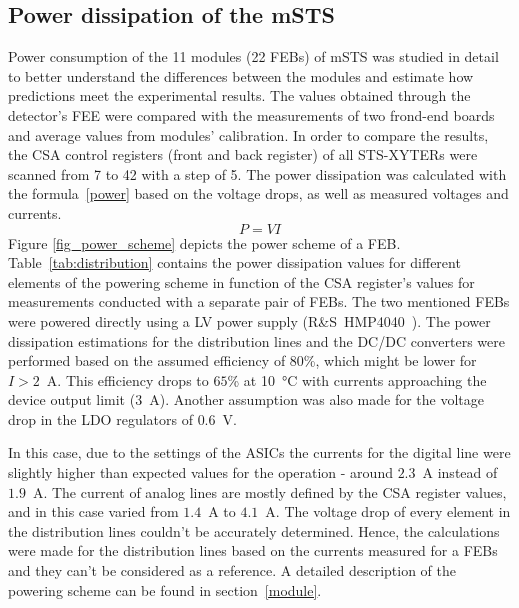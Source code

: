 \subsection{Power dissipation of the mSTS}
 Power consumption of the 11 modules (22 \glspl{FEB}) of \gls{mSTS} was studied in detail to better understand the differences between the modules and estimate how predictions meet the experimental results. The values obtained through the detector's \gls{FEE} were compared with the measurements of two frond-end boards and average values from modules' calibration. In order to compare the results, the \gls{CSA} control registers (front and back register) of all STS-XYTERs were scanned from 7 to 42 with a step of 5. The power dissipation was calculated with the formula~\ref{power} based on the voltage drops, as well as measured voltages and currents.
  \begin{equation}
  \label{power}
    P = VI
\end{equation}
Figure \ref{fig_power_scheme} depicts the power scheme of a \gls{FEB}. Table~\ref{tab:distribution} contains the power dissipation values for different elements of the powering scheme in function of the \gls{CSA} register's values for measurements conducted with a separate pair of \glspl{FEB}. The two mentioned \glspl{FEB} were powered directly using a \gls{LV} power supply (R\&S~HMP4040~\cite{RS}). The power dissipation estimations for the distribution lines and the DC/DC converters were performed based on the assumed efficiency of $80$\%, which might be lower for $I > 2$~A. This efficiency drops to $65$\% at \SI{10}{\celsius} with currents approaching the device output limit ($3$~A).  Another assumption was also made for the voltage drop in the \gls{LDO} regulators of $0.6$~V.
 
 In this case, due to the settings of the \glspl{ASIC} the currents for the digital line were slightly higher than expected values for the operation - around $2.3$~A instead of $1.9$~A. The current of analog lines are mostly defined by the \gls{CSA} register values, and in this case varied from $1.4$~A to $4.1$~A.  The voltage drop of every element in the distribution lines couldn't be accurately determined. Hence, the calculations were made for the distribution lines based on the currents measured for a \glspl{FEB} and they can't be considered as a reference. A detailed description of the powering scheme can be found in section~\ref{module}.


